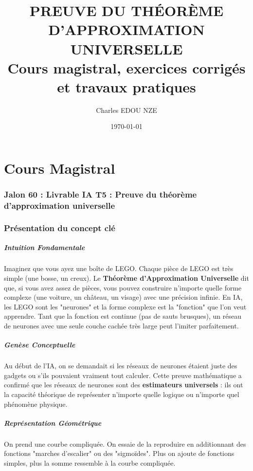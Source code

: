 \documentclass[11pt,a4paper]{article}
\title{\Huge PREUVE DU THÉORÈME D'APPROXIMATION UNIVERSELLE \\ \large Cours magistral, exercices corrigés et travaux pratiques}
\author{\Large Charles EDOU NZE}
\date{\today}
\begin{document}
\maketitle
\tableofcontents
\newpage

\part{Cours Magistral}

\section{Jalon 60 : Livrable IA T5 : Preuve du théorème d'approximation universelle}

\section{Présentation du concept clé}

\subsubsection{Intuition Fondamentale}
 Imaginez que vous ayez une boîte de LEGO. Chaque pièce de LEGO est très simple (une bosse, un creux). Le \textbf{Théorème d'Approximation Universelle} dit que, si vous avez assez de pièces, vous pouvez construire n'importe quelle forme complexe (une voiture, un château, un visage) avec une précision infinie. En IA, les LEGO sont les "neurones" et la forme complexe est la "fonction" que l'on veut apprendre. Tant que la fonction est continue (pas de sauts brusques), un réseau de neurones avec une seule couche cachée très large peut l'imiter parfaitement.
\subsubsection{Genèse Conceptuelle}
 Au début de l'IA, on se demandait si les réseaux de neurones étaient juste des gadgets ou s'ils pouvaient vraiment tout calculer. Cette preuve mathématique a confirmé que les réseaux de neurones sont des \textbf{estimateurs universels} : ils ont la capacité théorique de représenter n'importe quelle logique ou n'importe quel phénomène physique.
\subsubsection{Représentation Géométrique}
 On prend une courbe compliquée. On essaie de la reproduire en additionnant des fonctions "marches d'escalier" ou des "sigmoïdes". Plus on ajoute de fonctions simples, plus la somme ressemble à la courbe compliquée.
\end{document}
